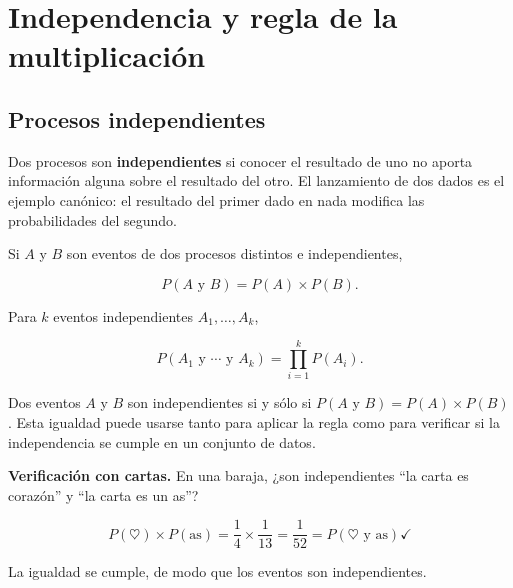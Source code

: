 \documentclass[
  spanish,
  letterpaper,
  DIV=11,
  numbers=noendperiod]{scrartcl}
\begin{document}
\section{Independencia y regla de la
multiplicación}\label{independencia-y-regla-de-la-multiplicaciuxf3n}

\subsection{Procesos independientes}\label{procesos-independientes}

Dos procesos son \textbf{independientes} si conocer el resultado de uno
no aporta información alguna sobre el resultado del otro. El lanzamiento
de dos dados es el ejemplo canónico: el resultado del primer dado en
nada modifica las probabilidades del segundo.

\begin{tcolorbox}[enhanced jigsaw, arc=.35mm, bottomrule=.15mm, bottomtitle=1mm, breakable, colback=white, colbacktitle=quarto-callout-important-color!10!white, colframe=quarto-callout-important-color-frame, coltitle=black, left=2mm, leftrule=.75mm, opacityback=0, opacitybacktitle=0.6, rightrule=.15mm, title=\textcolor{quarto-callout-important-color}{\faExclamation}\hspace{0.5em}{Regla de la multiplicación para procesos independientes}, titlerule=0mm, toprule=.15mm, toptitle=1mm]

Si \(A\) y \(B\) son eventos de dos procesos distintos e independientes,

\[P(A \text{ y } B) = P(A) \times P(B).\]

Para \(k\) eventos independientes \(A_1, \ldots, A_k\),

\[P(A_1 \text{ y } \cdots \text{ y } A_k) = \prod_{i=1}^{k} P(A_i).\]

\end{tcolorbox}

Dos eventos \(A\) y \(B\) son independientes si y sólo si
\(P(A \text{ y } B) = P(A) \times P(B)\). Esta igualdad puede usarse
tanto para aplicar la regla como para verificar si la independencia se
cumple en un conjunto de datos.

\textbf{Verificación con cartas.} En una baraja, ¿son independientes
``la carta es corazón'' y ``la carta es un as''?

\[P(\heartsuit) \times P(\text{as}) = \frac{1}{4} \times \frac{1}{13} = \frac{1}{52} = P(\heartsuit \text{ y as}) \checkmark\]

La igualdad se cumple, de modo que los eventos son independientes.
\end{document}

